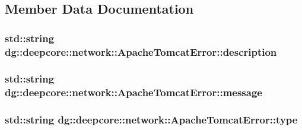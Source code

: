 \subsection{Member Data Documentation}
\subsubsection[{\texorpdfstring{description}{description}}]{\setlength{\rightskip}{0pt plus 5cm}std\+::string dg\+::deepcore\+::network\+::\+Apache\+Tomcat\+Error\+::description}\hypertarget{structdg_1_1deepcore_1_1network_1_1_apache_tomcat_error_a0ecd13bf1b2c5af20f99af250abb38f0}{}\label{structdg_1_1deepcore_1_1network_1_1_apache_tomcat_error_a0ecd13bf1b2c5af20f99af250abb38f0}
\subsubsection[{\texorpdfstring{message}{message}}]{\setlength{\rightskip}{0pt plus 5cm}std\+::string dg\+::deepcore\+::network\+::\+Apache\+Tomcat\+Error\+::message}\hypertarget{structdg_1_1deepcore_1_1network_1_1_apache_tomcat_error_a7a12e42bbfd8fa3548a148b67e5a8fb1}{}\label{structdg_1_1deepcore_1_1network_1_1_apache_tomcat_error_a7a12e42bbfd8fa3548a148b67e5a8fb1}
\subsubsection[{\texorpdfstring{type}{type}}]{\setlength{\rightskip}{0pt plus 5cm}std\+::string dg\+::deepcore\+::network\+::\+Apache\+Tomcat\+Error\+::type}\hypertarget{structdg_1_1deepcore_1_1network_1_1_apache_tomcat_error_ab36a2b24595385f2b1f169317249dcf0}{}\label{structdg_1_1deepcore_1_1network_1_1_apache_tomcat_error_ab36a2b24595385f2b1f169317249dcf0}
